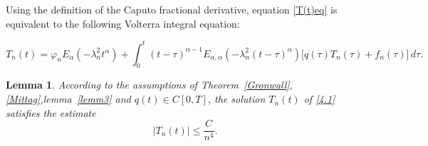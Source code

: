 \documentclass[reqno]{amsart}
\newtheorem{lem}[thm]{Lemma}
\theoremstyle{definition}
\numberwithin{equation}{section}
\begin{document}
Using the definition of the Caputo fractional derivative, equation \eqref{T(t)eq} is equivalent to the following Volterra integral equation:

\begin{equation}\label{4.1}
  T_n(t)
=
\varphi_n E_{\alpha}\!\left(-\lambda_n^2 t^{\alpha}\right)
+
\int_0^t
(t-\tau)^{\alpha-1}
E_{\alpha,\alpha}\!\left(-\lambda_n^2 (t-\tau)^{\alpha}\right)
\big[q(\tau)T_n(\tau)+f_n(\tau)\big]
\, d\tau.
\end{equation}

\begin{lem}\label{T(t)}
    According to the assumptions of Theorem~\ref{Gronwall}, \ref{Mittag},lemma~\ref{lemm3} and $q(t)\in C[0,T]$, the solution $T_n(t)$ of
\eqref{4.1} satisfies the estimate
\begin{equation*}
 |T_n(t)|\leq  \frac{C_{}}{n^4}.
\end{equation*}
\end{lem}
\end{document}
